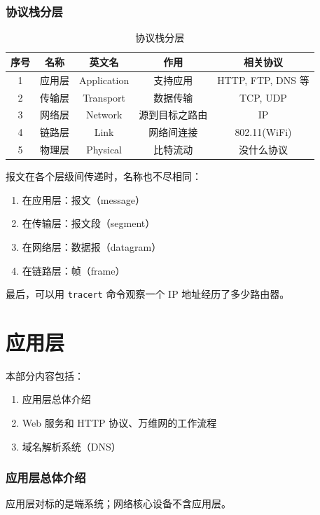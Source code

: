 \documentclass[UTF8]{ctexart}
\begin{document}
\section{协议栈分层}
\begin{table}[htb]
  \centering
  \begin{tabular}{ccccc}
  \toprule
  序号 & 名称 & 英文名 & 作用 & 相关协议 \\
  \midrule
  1 & 应用层 & Application & 支持应用 & HTTP, FTP, DNS 等 \\
  2 & 传输层 & Transport & 数据传输 & TCP, UDP \\
  3 & 网络层 & Network & 源到目标之路由 & IP \\
  4 & 链路层 & Link & 网络间连接 & 802.11(WiFi) \\
  5 & 物理层 & Physical & 比特流动 & 没什么协议 \\
  \bottomrule
  \end{tabular}
  \caption{协议栈分层}\label{tab:协议栈分层}
\end{table}

报文在各个层级间传递时，名称也不尽相同：
\begin{enumerate}[itemsep=0pt,parsep=0pt]
  \item 在应用层：报文（message）
  \item 在传输层：报文段（segment）
  \item 在网络层：数据报（datagram）
  \item 在链路层：帧（frame）
\end{enumerate}

最后，可以用 \verb!tracert! 命令观察一个 IP 地址经历了多少路由器。


\part{应用层}
\begin{mybox}
本部分内容包括：
\begin{enumerate}[itemsep=0pt,parsep=0pt]
  \item 应用层总体介绍
  \item Web 服务和 HTTP 协议、万维网的工作流程
  \item 域名解析系统（DNS）
\end{enumerate}
\end{mybox}

\section{应用层总体介绍}
应用层对标的是端系统；网络核心设备不含应用层。
\end{document}
